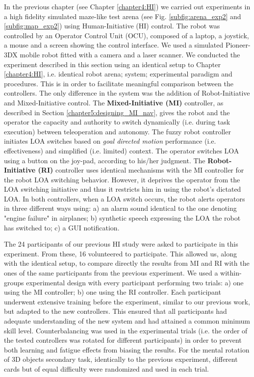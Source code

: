 \documentclass[a4paper,12pt,oneside,openright]{bhamthesis}
\begin{document}
In the previous chapter (see Chapter \ref{chapter4:HI}) we carried out experiments in a high fidelity simulated maze-like test arena (see Fig. \ref{subfig:arena_exp2} and \ref{subfig:map_exp2}) using Human-Initiative (HI) control. The robot was controlled by an Operator Control Unit (OCU), composed of a laptop, a joystick, a mouse and a screen showing the control interface. We used a simulated Pioneer-3DX mobile robot fitted with a camera and a laser scanner. We conducted the experiment described in this section using an identical setup to Chapter \ref{chapter4:HI}, i.e. identical robot arena; system; experimental paradigm and procedures. This is in order to facilitate meaningful comparison between the controllers. The only difference in the system was the addition of Robot-Initiative and Mixed-Initiative control. The \textbf{Mixed-Initiative (MI)} controller, as described in Section \ref{chapter5:designing_MI_nav}, gives the robot and the operator the capacity and authority to switch dynamically (i.e. during task execution) between teleoperation and autonomy. The fuzzy robot controller initiates LOA switches based on \textit{goal directed motion} performance (i.e. effectiveness) and simplified (i.e. limited) context. The operator switches LOA using a button on the joy-pad, according to his/her judgment. The \textbf{Robot-Initiative (RI)} controller uses identical mechanisms with the MI controller for the robot LOA switching behavior. However, it deprives the operator from the LOA switching initiative and thus it restricts him in using the robot's dictated LOA. In both controllers, when a LOA switch occurs, the robot alerts operators in three different ways using: a) an alarm sound identical to the one denoting "engine failure" in airplanes; b) synthetic speech expressing the LOA the robot has switched to; c) a GUI notification.

The 24 participants of our previous HI study were asked to participate in this experiment. From these, 16 volunteered to participate. This allowed us, along with the identical setup, to compare directly the results from MI and RI with the ones of the same participants from the previous experiment. We used a within-groups experimental design with every participant performing two trials: a) one using the MI controller; b) one using the RI controller. Each participant underwent extensive training before the experiment, similar to our previous work, but adapted to the new controllers. This ensured that all participants had adequate understanding of the new system and had attained a common minimum skill level. Counterbalancing was used in the experimental trials (i.e. the order of the tested controllers was rotated for different participants) in order to prevent both learning and fatigue effects from biasing the results. For the mental rotation of 3D objects secondary task, identically to the previous experiment, different cards but of equal difficulty \cite{Ganis2015} were randomized and used in each trial. 
\end{document}
